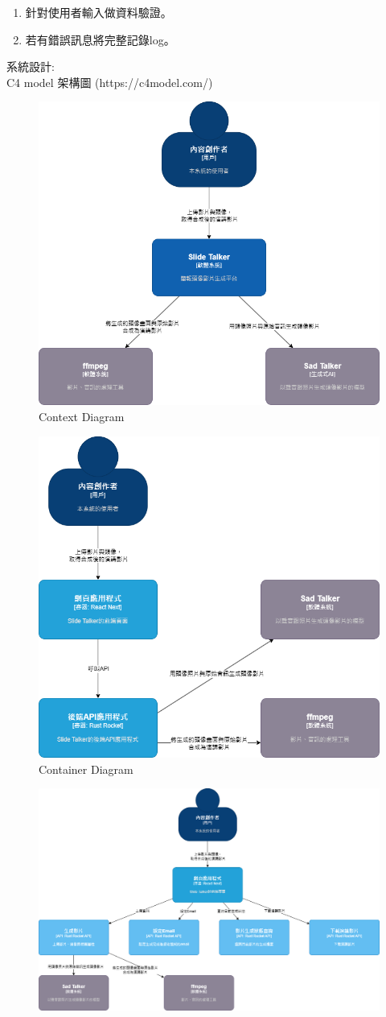 \documentclass[12pt]{article}
\begin{document}
\begin{enumerate}
\begin{enumerate}[label=\Alph*.]
\begin{enumerate}
\begin{enumerate}[label=(\arabic*)]
              \item 針對使用者輸入做資料驗證。
              \item 若有錯誤訊息將完整記錄log。
            \end{enumerate}
        \end{enumerate}
    \end{enumerate}
    系統設計: \\
    C4 model 架構圖 (https://c4model.com/)
    \begin{figure}[H]
      \centering
        \includegraphics[width=.5\textwidth]{./ar0.png}
      \caption{Context Diagram}
      \label{ar0}
    \end{figure}
    \begin{figure}[H]
      \centering
        \includegraphics[width=.5\textwidth]{./ar1.png}
      \caption{Container Diagram}
      \label{ar1}
    \end{figure}
    \begin{figure}[H]
      \centering
        \includegraphics[width=.5\textwidth]{./ar2.png}

\end{figure}
\end{enumerate}
\end{document}
